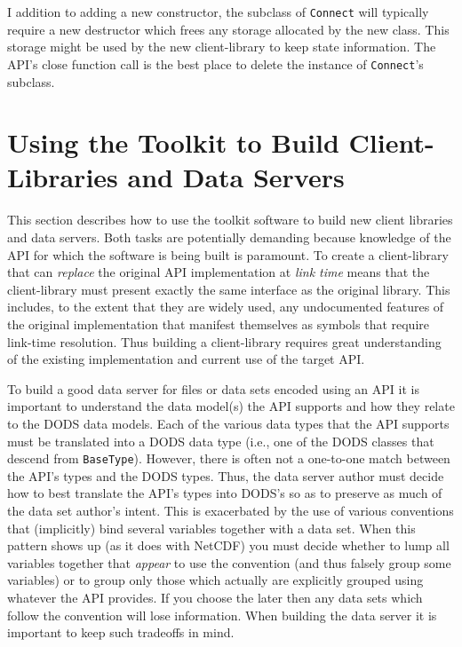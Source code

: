 I addition to adding a new constructor, the subclass of {\tt Connect} will
typically require a new destructor which frees any storage allocated by the
new class. This storage might be used by the new client-library to keep state
information. The API's close function call is the best place to delete the
instance of {\tt Connect}'s subclass.

\section{Using the Toolkit to Build Client-Libraries and Data Servers}
\label{tk:using}

This section describes how to use the toolkit software to build new client
libraries and data servers. Both tasks are potentially demanding because
knowledge of the API for which the software is being built is paramount. To
create a client-library that can {\em replace\/} the original API
implementation at {\em link time\/} means that the client-library must
present exactly the same interface as the original library. This includes,
to the extent that they are widely used, any undocumented features of the
original implementation that manifest themselves as symbols that require
link-time resolution. Thus building a client-library requires great
understanding of the existing implementation and current use of the target
API. 

To build a good data server for files or data sets encoded using an API it is
important to understand the data model(s) the API supports and how they
relate to the DODS data models. Each of the various data types that the API
supports must be translated into a DODS data type (i.e., one of the DODS
classes that descend from {\tt BaseType}). However, there is often not a
one-to-one match between the API's types and the DODS types. Thus, the data
server author must decide how to best translate the API's types into DODS's
so as to preserve as much of the data set author's intent. This is
exacerbated by the use of various conventions that (implicitly) bind several
variables together with a data set. When this pattern shows up (as it does
with NetCDF) you must decide whether to lump all variables together that {\em
  appear\/} to use the convention (and thus falsely group some variables) or
to group only those which actually are explicitly grouped using whatever the
API provides. If you choose the later then any data sets which follow the
convention will lose information. When building the data server it is
important to keep such tradeoffs in mind.

